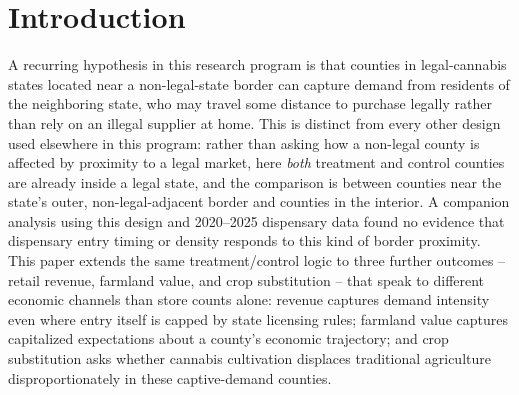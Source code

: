 ﻿\documentclass{article}
\begin{document}
\begin{abstract}
miles of its one non-legal neighbor, and the state's actual cannabis cultivation hub sits over 300 miles
away, near the California border instead. Finally, we subject the revenue-per-store result to three checks
that move beyond a fixed cross-sectional comparison. Following \citet{HansenMillerWeber2020}, who show
Washington border-with-Oregon sales fell 36 percent when Oregon's own market opened, we test whether
Colorado counties bordering New Mexico lost their premium after New Mexico's 2022 retail market opened: they
did, by 38.6 percent, a magnitude close to \citeauthor{HansenMillerWeber2020}'s own estimate at an
independent border; our own lower-frequency replication of their original Washington-Oregon setting,
however, does not reproduce their result, which we attribute to this paper's coarser annual data rather
than a genuine absence of the mechanism there. We also find that dispensaries do not open faster in border
counties initially, but a second dispensary follows significantly faster once a border county has a first
one, and that dispensaries within border counties are located measurably closer to the actual state line
than the county's own geography would predict -- direct evidence that sellers respond to, rather than are
merely correlated with, cross-border demand.
\end{abstract}

\section{Introduction}

A recurring hypothesis in this research program is that counties in legal-cannabis states located near a
non-legal-state border can capture demand from residents of the neighboring state, who may travel some
distance to purchase legally rather than rely on an illegal supplier at home. This is distinct from every
other design used elsewhere in this program: rather than asking how a non-legal county is affected by
proximity to a legal market, here \emph{both} treatment and control counties are already inside a legal
state, and the comparison is between counties near the state's outer, non-legal-adjacent border and
counties in the interior. A companion analysis using this design and 2020--2025 dispensary data found no
evidence that dispensary entry timing or density responds to this kind of border proximity. This paper
extends the same treatment/control logic to three further outcomes -- retail revenue, farmland value, and
crop substitution -- that speak to different economic channels than store counts alone: revenue captures
demand intensity even where entry itself is capped by state licensing rules; farmland value captures
capitalized expectations about a county's economic trajectory; and crop substitution asks whether
cannabis cultivation displaces traditional agriculture disproportionately in these captive-demand
counties.
\end{document}
